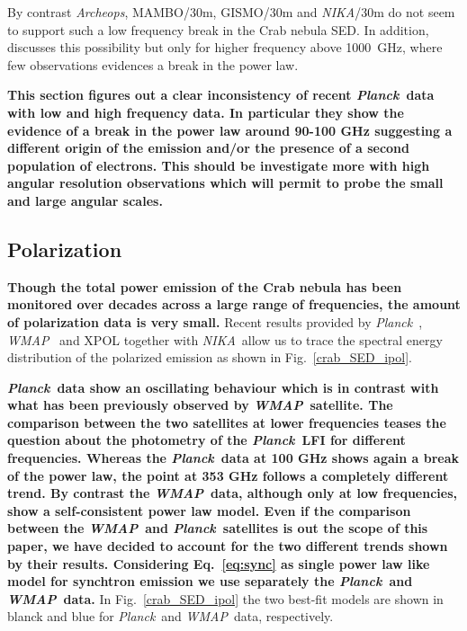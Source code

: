 \documentclass[twocolumn,traditabstract]{aa}
\def\NIKA{\textit{NIKA}}
\def\Planck{\textit{Planck}}
\def\WMAP{\textit{WMAP}}
\begin{document}
By contrast {\it Archeops}, MAMBO/30m, GISMO/30m
and \NIKA/30m do not seem to support such a low frequency break in the Crab nebula SED. In addition, \cite{macias2010} discusses this possibility but only for higher frequency above 1000~GHz, where few observations evidences a break in the power law. 

\textbf{This section figures out a clear inconsistency of recent \Planck\ data with low and high frequency data. In particular they show the evidence of a break in the power law around 90-100 GHz suggesting a different origin of the emission and/or the presence of a second population of electrons. This should be investigate more with high angular resolution observations which will permit to probe the small and large angular scales.}



\subsection{Polarization}
\textbf{Though the total power emission of the Crab nebula has been monitored over decades across a
large range of frequencies, the amount of polarization data is
very small.}
Recent results provided by
\Planck\ \citep{2015arXiv150702058P}, \WMAP\ \citep{2011ApJS..192...19W} and
XPOL \citep{aumont2010} together with \NIKA\ allow us to trace the spectral energy distribution of the polarized emission as shown in Fig.~\ref{crab_SED_ipol}.  

\textbf{\Planck\ data show an oscillating behaviour which is in contrast with what has been previously observed by \WMAP\ satellite.
The comparison between the two satellites at lower frequencies teases the question about the photometry of the \Planck\ LFI for different frequencies.
Whereas the \Planck\ data at 100 GHz shows again a break of the power law, the point at 353 GHz follows a completely different trend.
By contrast the \WMAP\ data, although only at low frequencies, show a self-consistent power law model.
Even if the comparison between the \WMAP\ and \Planck\ satellites is out the scope of this paper, we have decided to account for the two different trends shown by their results. Considering Eq.~\ref{eq:sync} as single power law like model for synchtron emission we use separately the \Planck\ and \WMAP\ data.}
In Fig.~\ref{crab_SED_ipol} the two best-fit models are shown in blanck and blue for \Planck\ and \WMAP\ data, respectively.
 
\end{document}
